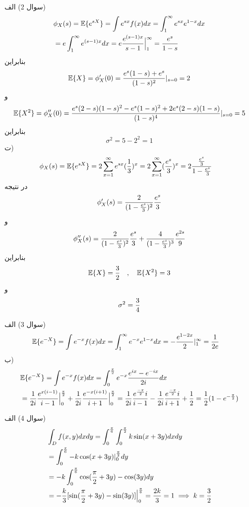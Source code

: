 \documentclass[10pt,letterpaper]{report}
\begin{document}
سوال 2) الف)
\begin{equation}
\begin{split}
&\phi_X(s)=\mathbb{E}\{e^{sX}\}=\int e^{sx}f(x)dx=\int_1^\infty e^{sx}e^{1-x}dx
\\&=
e\int_1^\infty e^{(s-1)x}dx
=e{e^{(s-1)x}\over s-1}\Big|_1^\infty={e^s\over 1-s}
\end{split}
\end{equation}
بنابراین
$$
\mathbb{E}\{X\}=\phi_X'(0)={e^s(1-s)+e^s\over (1-s)^2}|_{s=0}=2
$$
و
$$
\mathbb{E}\{X^2\}=\phi_X''(0)={e^s(2-s)(1-s)^2-e^s(1-s)^2+2e^s(2-s)(1-s)\over (1-s)^4}|_{s=0}=5
$$
بنابراین
$$
\sigma^2=5-2^2=1
$$
ت)
\begin{equation}
\begin{split}
&\phi_X(s)=\mathbb{E}\{e^{sX}\}=2\sum_{x=1}^\infty e^{sx}({1\over 3})^x
=2\sum_{x=1}^\infty ({e^s\over 3})^x=2{{e^{s}\over 3}\over 1-{e^{s}\over 3}}
\end{split}
\end{equation}
در نتیجه
$$
\phi'_X(s)={2\over (1-{e^s\over 3})^2}{e^s\over 3}
$$
و
$$
\phi''_X(s)={2\over (1-{e^s\over 3})^2}{e^s\over 3}+{4\over (1-{e^s\over 3})^3}{e^{2s}\over 9}
$$
بنابراین
$$
\mathbb{E}\{X\}={3\over 2}\quad,\quad \mathbb{E}\{X^2\}=3
$$
و
$$
\sigma^2={3\over 4}
$$

سوال 3) الف) 
\begin{equation}
\begin{split}
&\mathbb{E}\{e^{-X}\}=\int e^{-x}f(x)dx=\int_1^\infty e^{-x}e^{1-x}dx
=-{e^{1-2x}\over 2}|_1^\infty={1\over 2e}
\end{split}
\end{equation}
ب)
\begin{equation}
\begin{split}
&\mathbb{E}\{e^{-X}\}=\int e^{-x}f(x)dx=\int_0^{\pi\over 2} e^{-x}{e^{ix}-e^{-ix}\over 2i}dx
\\&=
{1\over 2i}{e^{x(i-1)}\over i-1}\Big|_0^{\pi \over 2}+{1\over 2i}{e^{-x(i+1)}\over i+1}\Big|_0^{\pi \over 2}={1\over 2i}{e^{-\pi\over 2}i\over i-1}-{1\over 2i}{e^{-\pi\over 2}i\over i+1}+{1\over 2}={1\over 2}(1-e^{-{\pi\over 2}})
\end{split}
\end{equation}

سوال 4) الف)
\begin{equation}
\begin{split}
&\int_D f(x,y)dxdy=\int_0^{\pi\over 6}\int_0^{\pi\over 2}k\sin (x+3y)dxdy
\\&=\int_0^{\pi\over 6}-k\cos (x+3y)|_{0}^{\pi\over 2}dy
\\&=-k\int_0^{\pi\over 6}\cos ({\pi\over 2}+3y)-\cos (3y)dy
\\&=-{k\over 3}[\sin ({\pi\over 2}+3y)-\sin (3y)]\Big|_0^{\pi\over 6}={2k\over 3}=1
\implies k={3\over 2}
\end{split}
\end{equation}
\end{document}
